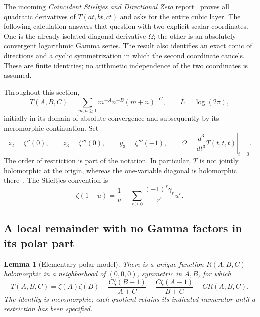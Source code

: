 \documentclass[11pt]{article}
\numberwithin{equation}{section}
\theoremstyle{plain}
\newtheorem{lemma}[theorem]{Lemma}
\theoremstyle{definition}
\theoremstyle{remark}
\begin{document}
The incoming \emph{Coincident Stieltjes and Directional Zeta} report~\cite{tr3:incoming} proves
all quadratic derivatives of $T(at,bt,ct)$ and asks for the entire cubic
layer.  The following calculation answers that question with two explicit
scalar coordinates.  One is the already isolated diagonal derivative
$\Omega$; the other is an absolutely convergent logarithmic Gamma series.
The result also identifies an exact conic of directions and a cyclic
symmetrization in which the second coordinate cancels.  These are finite
identities; no arithmetic independence of the two coordinates is assumed.

Throughout this section,
\[
 T(A,B,C)=\sum_{m,n\geq1}m^{-A}n^{-B}(m+n)^{-C},
 \qquad L=\log(2\pi),
\]
initially in its domain of absolute convergence and subsequently by its
meromorphic continuation.  Set
\[
 z_2=\zeta''(0),\qquad z_3=\zeta'''(0),\qquad
 y_3=\zeta'''(-1),\qquad
 \Omega=\left.\frac{d^3}{dt^3}T(t,t,t)\right|_{t=0}.
\]
The order of restriction is part of the notation.  In particular, $T$ is
not jointly holomorphic at the origin, whereas the one-variable diagonal
is holomorphic there~\cite{tr3:BD}.  The Stieltjes convention is
\[
 \zeta(1+u)=\frac1u+\sum_{r\geq0}\frac{(-1)^r\gamma_r}{r!}u^r.
\]

\subsection{A local remainder with no Gamma factors in its polar part}

\begin{lemma}[Elementary polar model]\label{tr3:polar}
There is a unique function $R(A,B,C)$ holomorphic in a neighborhood of
$(0,0,0)$, symmetric in $A,B$, for which
\begin{equation}\label{tr3:model}
 \boxed{\displaystyle
 T(A,B,C)=\zeta(A)\zeta(B)
  -\frac{C\zeta(B-1)}{A+C}
  -\frac{C\zeta(A-1)}{B+C}+C R(A,B,C).}
\end{equation}
The identity is meromorphic; each quotient retains its indicated
numerator until a restriction has been specified.
\end{lemma}
\end{document}
